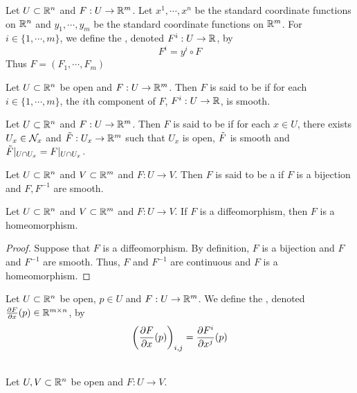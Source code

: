 \documentclass{book}
\begin{document}
	\begin{defn}
	Let $U \subset \mathbb{R}^n$ and $F: U \rightarrow \mathbb{R}^m$. Let $x^1, \cdots, x^n$ be the standard coordinate functions on $\mathbb{R}^n$ and $y_1, \cdots, y_m$ be the standard coordinate functions on $\mathbb{R}^m$. For $i \in \{1, \cdots, m\}$, we define the , denoted $F^i: U \rightarrow \mathbb{R}$, by $$F^i = y^i \circ F$$ 
	Thus $F = (F_1, \cdots, F_m)$
	\end{defn}
	
	\begin{defn}
	Let $U \subset \mathbb{R}^n$ be open and $F: U \rightarrow \mathbb{R}^m$. Then $F$ is said to be  if for each $i \in \{1, \cdots, m\}$, the $i$th component of $F$, $F^i: U \rightarrow \mathbb{R}$, is smooth.
	\end{defn}

	\begin{defn}
		Let $U \subset \mathbb{R}^n$ and $F: U \rightarrow \mathbb{R}^m$. Then $F$ is said to be  if for each $x \in U$, there exists $U_x \in \mathcal{N}_x$ and $\tilde{F} : U_x \rightarrow \mathbb{R}^m$ such that $U_x$ is open, $\tilde{F}$ is smooth and $\tilde{F}|_{U \cap U_x} = F|_{U \cap U_x}$.
	\end{defn}

	\begin{defn}
		Let $U \subset \mathbb{R}^n$ and $V \subset \mathbb{R}^m$ and $F: U \rightarrow V$. Then $F$ is said to be a   if $F$ is a bijection and $F, F^{-1}$ are smooth. 
	\end{defn}
	
	\begin{ex}
	Let $U \subset \mathbb{R}^n$ and $V \subset \mathbb{R}^m$ and $F: U \rightarrow V$. If $F$ is a diffeomorphism, then $F$ is a homeomorphism.
	\end{ex}
	
	\begin{proof}
	Suppose that $F$ is a diffeomorphism. By definition, $F$ is a bijection and $F$ and $F^{-1}$ are smooth. Thus, $F$ and $F^{-1}$ are continuous and $F$ is a homeomorphism.
	\end{proof}
	
	\begin{defn}
	Let $U \subset \mathbb{R}^n$ be open, $p \in U$ and $F: U \rightarrow \mathbb{R}^m$. We define the , denoted $\frac{\partial F}{\partial x}(p) \in \mathbb{R}^{m \times n}$, by $$\bigg (\frac{\partial F}{\partial x}(p) \bigg )_{i,j} = \frac{\partial F^i}{\partial x^j}(p)$$
	\end{defn}
	
	\begin{ex}\\
	Let $U,V \subset \mathbb{R}^n$ be open and $F: U \rightarrow V$.
	\end{ex}
	
\end{document}
